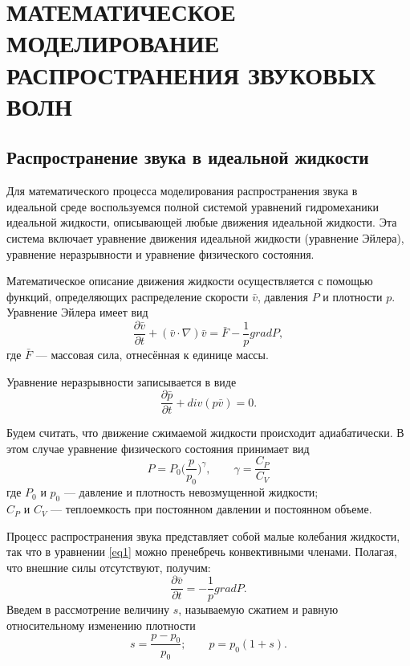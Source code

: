 \section{МАТЕМАТИЧЕСКОЕ МОДЕЛИРОВАНИЕ РАСПРОСТРАНЕНИЯ ЗВУКОВЫХ ВОЛН}

\newpage
\subsection{Распространение звука в идеальной жидкости}

Для математического процесса моделирования распространения звука в идеальной среде воспользуемся полной системой уравнений гидромеханики идеальной жидкости, описывающей любые движения идеальной жидкости. Эта система включает уравнение движения идеальной жидкости (уравнение Эйлера), уравнение неразрывности и уравнение физического состояния.

Математическое описание движения жидкости осуществляется с помощью функций, определяющих распределение скорости $\bar{v}$, давления $P$ и плотности $p$. Уравнение Эйлера имеет вид
\begin{equation}\label{eq1}
\frac{\partial \bar{v}}{\partial t} + (\bar{v} \cdot \nabla)\bar{v} = \bar F - \frac{1}{p} grad P,
\end{equation}
где $\bar F$ --- массовая сила, отнесённая к единице массы.

Уравнение неразрывности записывается в виде
\begin{equation}\label{eq2}
\frac{\partial \bar{p}}{\partial t} +  div (p \bar{v}) = 0.
\end{equation}

Будем считать, что движение сжимаемой жидкости происходит адиабатически. В этом случае уравнение физического состояния принимает вид
\begin{equation}\label{eq3}
P=P_0\bigg(\frac{p}{p_0}\bigg)^\gamma, \qquad \gamma=\frac{C_P}{C_V}
\end{equation}
где $P_0$ и $p_0$ --- давление и плотность невозмущенной жидкости; \\
 $C_P$ и $C_V$ --- теплоемкость при постоянном давлении и постоянном объеме.

Процесс распространения звука представляет собой малые колебания жидкости, так что в уравнении \eqref{eq1} можно пренебречь конвективными членами. Полагая, что внешние силы отсутствуют, получим:
\begin{equation}\label{eq4}
\frac{\partial \bar{v}}{\partial t} = - \frac{1}{p} grad P.
\end{equation}
Введем в рассмотрение величину $s$, называемую сжатием и равную относительному изменению плотности
\begin{equation}\label{eq5}
s=\frac{p - p_0}{p_0}; \qquad p = p_0 (1+s).
\end{equation}

